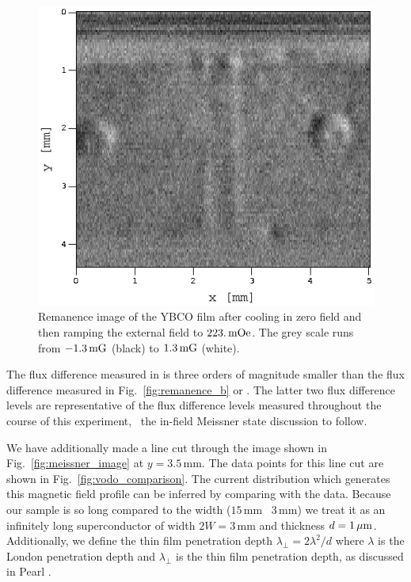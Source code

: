 %
%
\begin{figure}[p]
\includegraphics[width=5.7in]{figs/magpen/fig11a.eps}
\caption[Remanence image of YBCO/STO film after peak field of
$223\,\mOe$.]
{Remanence image of the YBCO film after cooling in zero
field and then ramping the external field to 
$223.\,\mathrm{mOe}$.
The grey scale runs from $-1.3\,\mathrm{mG}$ (black) to $1.3\,\mathrm{mG}$ (white).
 }
\label{fig:remanence_a}
\end{figure}

The flux difference measured in  
is three orders of magnitude smaller than the flux difference measured in 
Fig.~\ref{fig:remanence_b} or 
. The latter two flux difference levels 
are representative
of the flux difference levels measured throughout the course of this
experiment, \ie\ the in-field Meissner state discussion to follow. 

We have additionally made a line cut through the image shown in
Fig.~\ref{fig:meissner_image} at $y=3.5\,\mathrm{mm}$. 
The data points for this line cut are shown in 
Fig.~\ref{fig:vodo_comparison}. The 
current distribution which generates this magnetic field profile
can be inferred by comparing with the data. Because our sample is
so long compared to the width ($15\,\mathrm{mm}$ \vs\ $3\,\mathrm{mm}$)
we treat it as an infinitely long superconductor of width 
$2 W=3\,\mathrm{mm}$ and thickness $d = 1\,\mu\mathrm{m}$.
Additionally, 
we define the thin film penetration depth
$\lambda_\perp = 2 \lambda^2/d$ where $\lambda$ is the
% 
London penetration depth and $\lambda_\perp$ is the thin film
penetration depth, as discussed in Pearl \cite{pearl_lt9_566_1965,%
pearl_apl_5_65_1964}.

